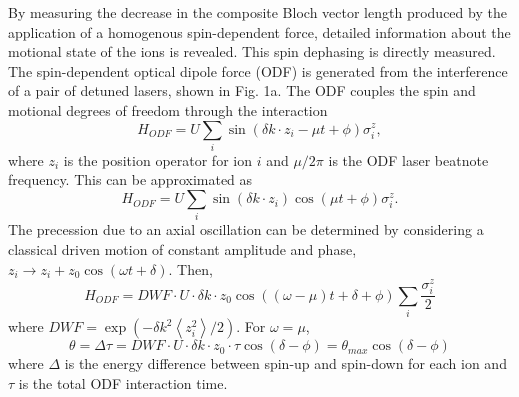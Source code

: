 \documentclass[aps,prl,twocolumn,groupedaddress]{revtex4-1}
\begin{document}
By measuring the decrease in the composite Bloch vector length produced by the application of a homogenous spin-dependent force, detailed information about the motional state of the ions is revealed. This spin dephasing is directly measured. The spin-dependent optical dipole force (ODF) is generated from the interference of a pair of detuned lasers, shown in Fig. 1a. The ODF couples the spin and motional degrees of freedom through the interaction 
\begin{equation}
H_{ODF} = U\sum_{i}\sin(\delta k \cdot z_i - \mu t + \phi)\sigma^{z}_i,
\end{equation}
where $z_i$ is the position operator for ion $i$ and $\mu/2\pi$ is the ODF laser beatnote frequency. This can be approximated as
\[H_{ODF} = U\sum_{i}\sin(\delta k \cdot z_i)\cos(\mu t + \phi)\sigma^{z}_i. \]
The precession due to an axial oscillation can be determined by considering a classical driven motion of constant amplitude and phase, $z_i \rightarrow z_i +z_0\cos(\omega t+\delta)$.
Then,
\[H_{ODF} = DWF \cdot U \cdot \delta k \cdot z_0\cos((\omega - \mu)t + \delta + \phi) \sum_{i} \frac{\sigma^{z}_{i}}{2} \]
where $DWF = \exp(-\delta k^2 \left< z^{2}_{i} \right> /2) $.
For $ \omega = \mu $,
\[\theta = \Delta\tau = DWF \cdot U \cdot \delta k \cdot z_0 \cdot \tau \cos(\delta - \phi) = \theta_{max}\cos(\delta - \phi)\]
where $\Delta$ is the energy difference between spin-up and spin-down for each ion and $\tau$ is the total ODF interaction time.
\end{document}
